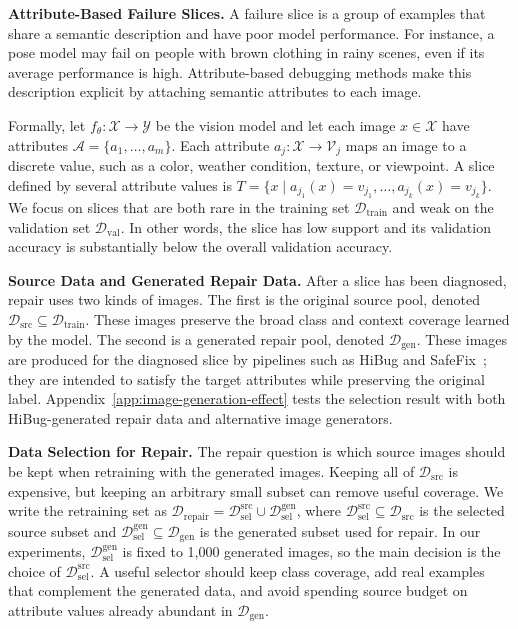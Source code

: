 \documentclass{article}
\newcommand{\dataset}{\mathcal{D}}
\newcommand{\attrs}{\mathcal{A}}
\newcommand{\vals}{\mathcal{V}}
\newcommand{\inputspace}{\mathcal{X}}
\newcommand{\labelspace}{\mathcal{Y}}
\begin{document}
\noindent\textbf{Attribute-Based Failure Slices.} A failure slice is a group of examples that share a semantic description and have poor model performance. For instance, a pose model may fail on people with brown clothing in rainy scenes, even if its average performance is high. Attribute-based debugging methods make this description explicit by attaching semantic attributes to each image.

Formally, let $f_\theta : \inputspace \rightarrow \labelspace$ be the vision model and let each image $x\in\inputspace$ have attributes $\attrs=\{a_1,\ldots,a_m\}$. Each attribute $a_j:\inputspace\rightarrow\vals_j$ maps an image to a discrete value, such as a color, weather condition, texture, or viewpoint. A slice defined by several attribute values is $T = \{x \mid a_{j_1}(x) = v_{j_1}, \ldots, a_{j_k}(x) = v_{j_k}\}$.
We focus on slices that are both rare in the training set $\dataset_{\mathrm{train}}$ and weak on the validation set $\dataset_{\mathrm{val}}$. In other words, the slice has low support and its validation accuracy is substantially below the overall validation accuracy.

\noindent\textbf{Source Data and Generated Repair Data.} After a slice has been diagnosed, repair uses two kinds of images. The first is the original source pool, denoted $\dataset_{\mathrm{src}}\subseteq\dataset_{\mathrm{train}}$. These images preserve the broad class and context coverage learned by the model. The second is a generated repair pool, denoted $\dataset_{\mathrm{gen}}$. These images are produced for the diagnosed slice by pipelines such as HiBug and SafeFix~\citep{chen2023hibug,xu2025safefix}; they are intended to satisfy the target attributes while preserving the original label. Appendix~\ref{app:image-generation-effect} tests the selection result with both HiBug-generated repair data and alternative image generators.

\noindent\textbf{Data Selection for Repair.} The repair question is which source images should be kept when retraining with the generated images. Keeping all of $\dataset_{\mathrm{src}}$ is expensive, but keeping an arbitrary small subset can remove useful coverage. We write the retraining set as $\dataset_{\mathrm{repair}} = \dataset_{\mathrm{sel}}^{\mathrm{src}} \cup \dataset_{\mathrm{sel}}^{\mathrm{gen}}$, where $\dataset_{\mathrm{sel}}^{\mathrm{src}}\subseteq\dataset_{\mathrm{src}}$ is the selected source subset and $\dataset_{\mathrm{sel}}^{\mathrm{gen}}\subseteq\dataset_{\mathrm{gen}}$ is the generated subset used for repair. In our experiments, $\dataset_{\mathrm{sel}}^{\mathrm{gen}}$ is fixed to 1,000 generated images, so the main decision is the choice of $\dataset_{\mathrm{sel}}^{\mathrm{src}}$. A useful selector should keep class coverage, add real examples that complement the generated data, and avoid spending source budget on attribute values already abundant in $\dataset_{\mathrm{gen}}$.
\end{document}
